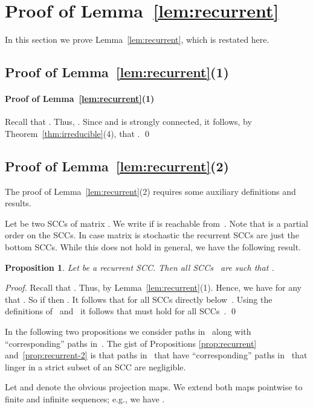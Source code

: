 \documentclass{elsarticle}
\newtheorem{proposition}[definition]{Proposition}
\begin{document}
\section{Proof of Lemma~\ref{lem:recurrent}}
\label{sec:recurrent-proof}

In this section we prove Lemma~\ref{lem:recurrent}, which is restated here.

\lemrecurrent*

\subsection{Proof of Lemma~\ref{lem:recurrent}(1)}
\paragraph{Proof of Lemma~\ref{lem:recurrent}(1)}
Recall that .
Thus, .
Since  and  is strongly connected, it follows, by Theorem~\ref{thm:irreducible}(4), that .  \qed

\subsection{Proof of Lemma~\ref{lem:recurrent}(2)}
The proof of Lemma~\ref{lem:recurrent}(2) requires some auxiliary
definitions and results.

Let  be two SCCs of matrix .  We write
 if  is reachable from~.  Note that
 is a partial order on the SCCs.
In case matrix  is stochastic the recurrent SCCs are just the
bottom SCCs.  While this does not hold in general, we have the
following result.
\begin{proposition}
\label{prop:lower-matrices-zero}
Let  be a recurrent SCC.  Then all SCCs~
are such that .
\end{proposition}
\begin{proof}
Recall that .
Thus,  by Lemma~\ref{lem:recurrent}(1).
Hence, we have for any  that .
So if  then .
It follows that  for
all SCCs  directly below~.
Using the definitions of~ and~ it follows that  must hold for all SCCs~.
\qed
\end{proof}

In the following two propositions we consider paths in~ along with ``corresponding'' paths in~.
The gist of Propositions \ref{prop:recurrent} and~\ref{prop:recurrent-2} is that paths in~ that have ``corresponding'' paths in~ that linger in a strict subset of an SCC are negligible.

Let  and  denote the obvious projection maps.  We extend both
maps pointwise to finite and infinite sequences; e.g., we have .
\end{document}
